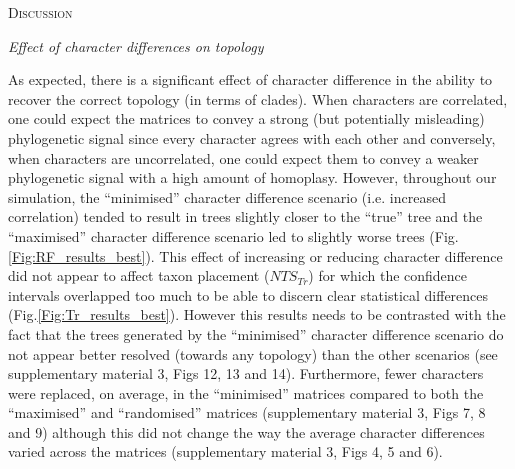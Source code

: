 \documentclass[12pt,letterpaper]{article}
\renewcommand{\section}[1]{%
\bigskip
\begin{center}
\begin{Large}
\normalfont\scshape #1
\medskip
\end{Large}
\end{center}}
\renewcommand{\subsection}[1]{%
\bigskip
\begin{center}
\begin{large}
\normalfont\itshape #1
\end{large}
\end{center}}
\begin{document}
\section{Discussion}

\subsection{Effect of character differences on topology}
As expected, there is a significant effect of character difference in the ability to recover the correct topology (in terms of clades).
When characters are correlated, one could expect the matrices to convey a strong (but potentially misleading) phylogenetic signal since every character agrees with each other and conversely, when characters are uncorrelated, one could expect them to convey a weaker phylogenetic signal with a high amount of homoplasy.
However, throughout our simulation, the ``minimised'' character difference scenario (i.e. increased correlation) tended to result in trees slightly closer to the ``true'' tree and the ``maximised'' character difference scenario led to slightly worse trees (Fig. \ref{Fig:RF_results_best}).
This effect of increasing or reducing character difference did not appear to affect taxon placement ($NTS_{Tr}$) for which the confidence intervals overlapped too much to be able to discern clear statistical differences (Fig.\ref{Fig:Tr_results_best}).
However this results needs to be contrasted with the fact that the trees generated by the ``minimised'' character difference scenario do not appear better resolved (towards any topology) than the other scenarios (see supplementary material 3, Figs 12, 13 and 14).
Furthermore, fewer characters were replaced, on average, in the ``minimised'' matrices compared to both the ``maximised'' and ``randomised'' matrices (supplementary material 3, Figs 7, 8 and 9) although this did not change the way the average character differences varied across the matrices (supplementary material 3, Figs 4, 5 and 6).%
\end{document}
